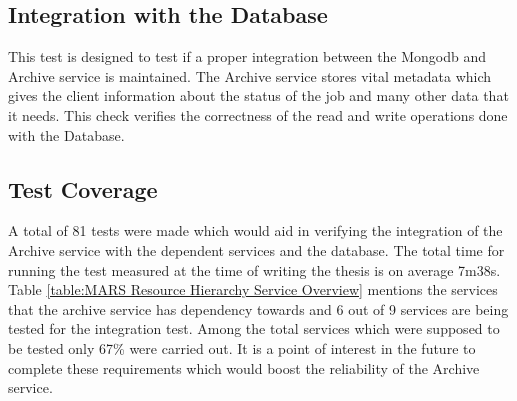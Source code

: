 \subsection{Integration with the Database}
This test is designed to test if a proper integration between the Mongodb and Archive service is maintained. The Archive service stores vital metadata
which gives the client information about the status of the job and many other data that it needs. This check verifies the correctness of the read and write 
operations done with the Database. 

\subsection{Test Coverage}
A total of 81 tests were made which would aid in verifying the integration of the Archive service with the dependent services and the database. The 
total time for running the test measured at the time of writing the thesis is on average 7m38s. Table \ref{table:MARS Resource Hierarchy Service Overview}
mentions the services that the archive service has dependency towards and 6 out of 9 services are being tested for the integration test. Among the total services 
which were supposed to be tested only 67\%  were carried out. It is a point of interest in the future to complete these requirements which would boost the
reliability of the Archive service. 
